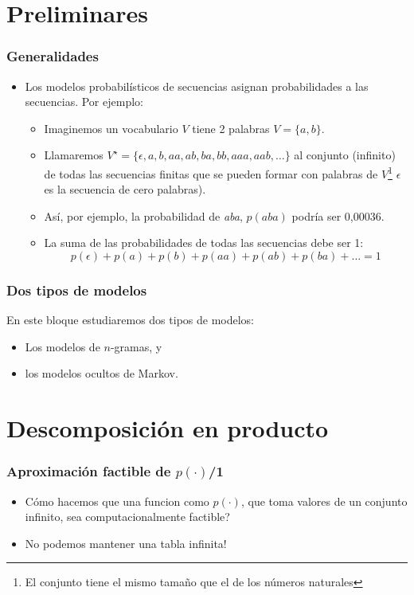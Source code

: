 \section{Preliminares}
\begin{frame}
  \frametitle{Generalidades}
  \begin{itemize}
  \item Los modelos probabilísticos de secuencias asignan probabilidades a las secuencias. Por ejemplo:
    \begin{itemize}
    \item Imaginemos un  vocabulario \(V\) tiene 2 palabras \(V=\{a,b\}\).
    \item Llamaremos
      \(V^\star=\{\epsilon,a,b,aa,ab,ba,bb,aaa,aab,\ldots\}\)
      al conjunto (infinito) de todas las secuencias finitas que se
      pueden formar con palabras de \(V\)\footnote{El conjunto tiene el mismo tamaño que el de los números naturales}  \(\epsilon\) es la secuencia de cero palabras).
    \item Así, por ejemplo, la probabilidad de \emph{aba}, \(p(aba)\)
      podría ser 0,00036.
    \item La suma de las probabilidades de todas las secuencias debe ser 1:
\[p(\epsilon)+p(a)+p(b)+p(aa)+p(ab)+p(ba)+\ldots = 1\]
    \end{itemize}
  \end{itemize}

\end{frame}


\begin{frame}
\frametitle{Dos tipos de modelos}

En este bloque estudiaremos dos tipos de modelos:
  \begin{itemize}
  \item  Los modelos de \(n\)-gramas, y
  \item los modelos ocultos de Markov.
  \end{itemize}

\end{frame}

\section{Descomposición en producto}
\begin{frame}
  \frametitle{Aproximación factible de \(p(\cdot)\)/1}
  \begin{itemize}
  \item Cómo hacemos que una funcion como \(p(\cdot)\), que toma valores de un conjunto infinito, sea computacionalmente factible?
  \item No podemos mantener una tabla infinita!
  \end{itemize}


\end{frame}

